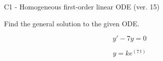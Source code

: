 \begin{exercise}
  \begin{exerciseTitle}C1 - Homogeneous first-order linear ODE (ver. 15)\end{exerciseTitle}
  \begin{exerciseStatement}
    
Find the general solution to the given ODE.

    
\[y'-7y=0\]

  \end{exerciseStatement}
  \begin{exerciseAnswer}
    
\[y= k e^{\left(7 \, t\right)}\]

  \end{exerciseAnswer}
\end{exercise}